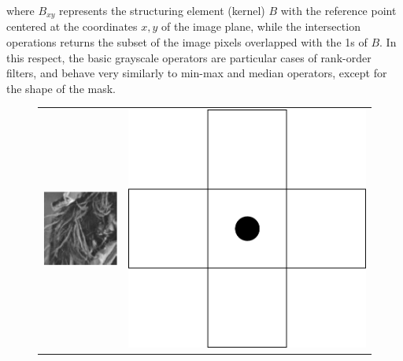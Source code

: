 \documentclass[review]{elsarticle}
\begin{document}
where $B_{xy}$ represents the structuring element (kernel) $B$ with the reference point centered at the coordinates $x,y$ of the image plane, while the intersection operations returns the subset of the image pixels overlapped with the 1s of $B$. In this respect, the basic grayscale operators are particular cases of rank-order filters, and behave very similarly to min-max and median operators, except for the shape of the mask.

\begin{figure}[h!]
	\centering
	\begin{tabular}{cc}
		\centering
		\includegraphics[scale=1]{original.eps} & \includegraphics[scale=0.1]{mask.png} \\

\end{tabular}
\end{figure}
\end{document}
